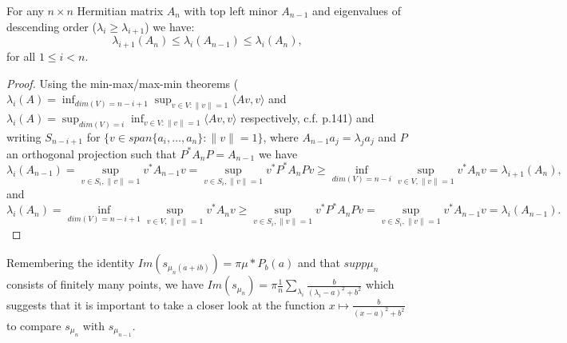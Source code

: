 \begin{theorem}
	For any $n\times n$ Hermitian matrix $A_n$ with top left minor $A_{n-1}$ and eigenvalues of descending order ($\lambda_i\geq\lambda_{i+1}$) we have:
	\begin{equation*}
		\lambda_{i+1}(A_n)\leq\lambda_i(A_{n-1})\leq\lambda_i(A_n), 
	\end{equation*}
	for all $1\leq i < n$.
\end{theorem}
\begin{proof}
Using the min-max/max-min theorems ($\lambda_i(A)=\inf_{dim(V)=n-i+1}\sup_{v\in V : \|v\|=1}\langle Av,v\rangle$ and $\lambda_i(A)=\sup_{dim(V)=i}\inf_{v\in V : \|v\|=1}\langle Av,v\rangle$ respectively, c.f. \cite{TeschlQM} p.141) and writing $S_{n-i+1}$ for $\{v\in span\{a_i,\dots,a_n\}: \|v\|=1\}$, where $A_{n-1}a_j=\lambda_j a_j$ and $P$ an orthogonal projection such that $P^*A_nP=A_{n-1}$ we have
	\begin{equation*}
		\lambda_i(A_{n-1}) =
		\sup_{v\in S_i,\|v\|=1}v^*A_{n-1}v =
		\sup_{v\in S_i,\|v\|=1}v^*P^*A_nPv\geq
		\inf_{dim(V)=n-i}\sup_{v\in V,\|v\|=1}v^*A_nv =
		\lambda_{i+1}(A_n),
	\end{equation*}
	and
	\begin{equation*}
		\lambda_i(A_n) =
		\inf_{dim(V)=n-i+1}\sup_{v\in V,\|v\|=1}v^*A_nv \geq
		\sup_{v\in S_i,\|v\|=1}v^*P^*A_nPv =
		\sup_{v\in S_i,\|v\|=1}v^*A_{n-1}v =
		\lambda_i(A_{n-1}).%
	\end{equation*}
\end{proof}

Remembering the identity $Im(s_{\mu_n(a+ib)})=\pi\mu*P_b(a)$ and that $supp\mu_n$ consists of finitely many points, we have $Im(s_{\mu_n})=\pi\frac{1}{n}\sum_{\lambda_i}\frac{b}{(\lambda_i-a)^2+b^2}$ which suggests that it is important to take a closer look at the function $x\mapsto\frac{b}{(x-a)^2+b^2}$ to compare $s_{\mu_n}$ with $s_{\mu_{n-1}}$.

